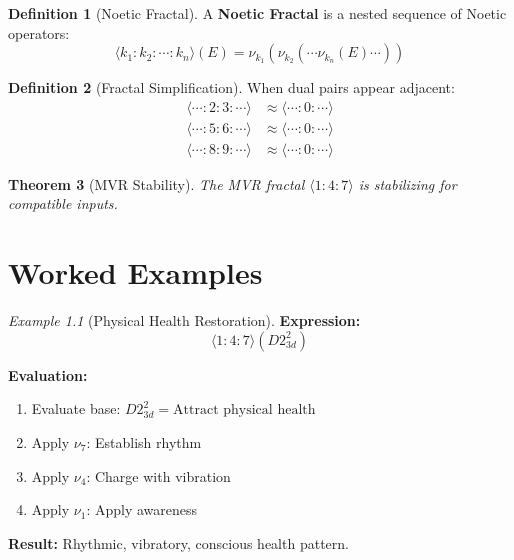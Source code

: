 \documentclass[11pt,twoside,openright]{book}
\theoremstyle{definition}
\newtheorem{definition}{Definition}[chapter]
\theoremstyle{plain}
\newtheorem{theorem}[definition]{Theorem}
\theoremstyle{remark}
\newtheorem{example}[definition]{Example}
\newcommand{\noe}[1]{\nu_{#1}}
\begin{document}
\begin{definition}[Noetic Fractal]
\label{def:noetic-fractal}
A \textbf{Noetic Fractal} is a nested sequence of Noetic operators:
\[
\langle k_1 : k_2 : \cdots : k_n \rangle(E) = \noe{k_1}(\noe{k_2}(\cdots\noe{k_n}(E)\cdots))
\]
\end{definition}

\begin{definition}[Fractal Simplification]
\label{def:fractal-simp}
When dual pairs appear adjacent:
\begin{align}
\langle \cdots : 2 : 3 : \cdots \rangle &\approx \langle \cdots : 0 : \cdots \rangle \\
\langle \cdots : 5 : 6 : \cdots \rangle &\approx \langle \cdots : 0 : \cdots \rangle \\
\langle \cdots : 8 : 9 : \cdots \rangle &\approx \langle \cdots : 0 : \cdots \rangle
\end{align}
\end{definition}

\begin{theorem}[MVR Stability]
\label{thm:mvr-stab}
The MVR fractal $\langle 1 : 4 : 7 \rangle$ is stabilizing for compatible inputs.
\end{theorem}

\chapter{Worked Examples}
\label{ch:examples}

\begin{example}[Physical Health Restoration]
\label{ex:health}
\textbf{Expression:}
\[
\langle 1 : 4 : 7 \rangle(D2^2_{3d})
\]

\textbf{Evaluation:}
\begin{enumerate}
\item Evaluate base: $D2^2_{3d} = \text{Attract physical health}$
\item Apply $\noe{7}$: Establish rhythm
\item Apply $\noe{4}$: Charge with vibration
\item Apply $\noe{1}$: Apply awareness
\end{enumerate}

\textbf{Result:} Rhythmic, vibratory, conscious health pattern.
\end{example}
\end{document}

